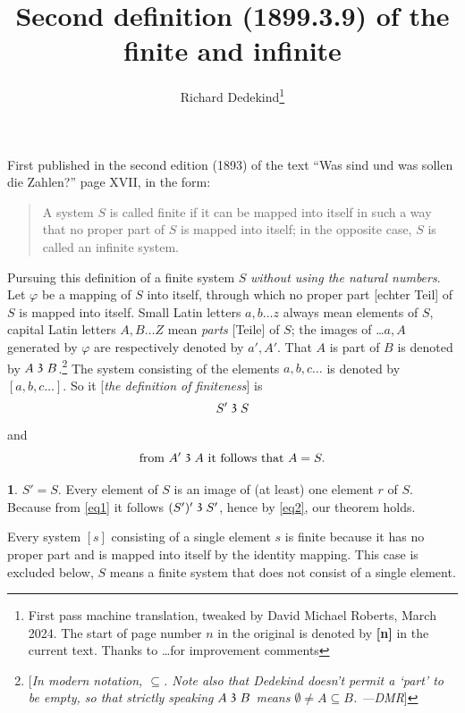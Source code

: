 \documentclass[leqno,hidelinks,a4paper]{article}
\theoremstyle{definition}
\newtheorem{satz}{\protect\satzname}
\newcommand{\satzname}{}
\renewcommand{\satzname}{\hspace{-4pt}.\ Satz}%
\renewcommand{\satzname}{\hspace{-4pt}.\ Theorem}%
\newcommand\partof{\mathrel{\raisebox{0.45ex}{$\mathfrak{3}$}}}
\begin{document}
\title{Second definition (1899.3.9) of the finite and infinite}
\author{Richard Dedekind\thanks{First pass machine translation, tweaked by David Michael Roberts, March 2024. The start of page number $n$ in the original is denoted by \textbf{[n]} in the current text. Thanks to \ldots for improvement comments}}
\date{}
\maketitle

First published in the second edition (1893) of the text ``Was sind und was sollen die Zahlen?'' page XVII, in the form:

\begin{quote}
A system $S$ is called finite if it can be mapped into itself in such a way that no proper part of $S$ is mapped into itself; in the opposite case, $S$ is called an infinite system.
\end{quote}

Pursuing this definition of a finite system $S$ \emph{without using the natural numbers}.
Let $\varphi$ be a mapping of $S$ into itself, through which no proper part [echter Teil] of $S$ is mapped into itself.
Small Latin letters $a, b \ldots z$ always mean elements of $S$, capital Latin letters $A, B \ldots Z$ mean \emph{parts} [Teile] of $S$; the images of \ldots $a, A$ generated by $\varphi$ are respectively denoted by $a', A'$.
That $A$ is part of $B$ is denoted by $A \partof B$.\footnote{[\emph{In modern notation, $\subseteq$. Note also that Dedekind doesn't permit a `part' to be empty, so that strictly speaking $A\partof B$ means $\emptyset \neq A \subseteq B$. ---DMR}]} The system consisting of the elements $a, b, c \ldots $ is denoted by $[a, b, c \ldots]$.
So it [\emph{the definition of finiteness}] is
\begin{equation}\label{eq1}
				S' \partof S
\end{equation}
and
\begin{equation}\label{eq2}
		\text{from } A' \partof A \text{ it follows that } A = S.
\end{equation}

\begin{satz}\label{thm1}
$S' = S$. Every element of $S$ is an image of (at least) one element $r$ of $S$. Because from \eqref{eq1} it follows $(S')' \partof S'$, hence by \eqref{eq2}, our theorem holds.
\end{satz}

Every system $[s]$ consisting of a single element $s$ is finite because it has no proper part and is mapped into itself by the identity mapping.
This case is excluded below, $S$ means a finite system that does not consist of a single element.
\end{document}
